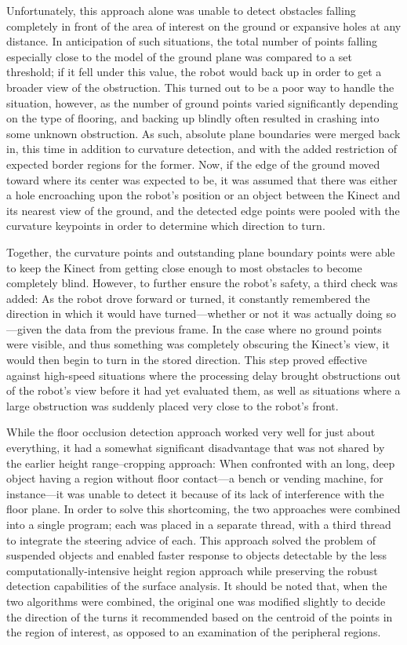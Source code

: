 \documentclass[12pt]{report}
\begin{document}
Unfortunately, this approach alone was unable to detect obstacles falling completely in front of the area of interest on the ground or expansive holes at any distance.  In anticipation of such situations, the total number of points falling especially close to the model of the ground plane was compared to a set threshold; if it fell under this value, the robot would back up in order to get a broader view of the obstruction.  This turned out to be a poor way to handle the situation, however, as the number of ground points varied significantly depending on the type of flooring, and backing up blindly often resulted in crashing into some unknown obstruction.  As such, absolute plane boundaries were merged back in, this time in addition to curvature detection, and with the added restriction of expected border regions for the former.  Now, if the edge of the ground moved toward where its center was expected to be, it was assumed that there was either a hole encroaching upon the robot's position or an object between the Kinect and its nearest view of the ground, and the detected edge points were pooled with the curvature keypoints in order to determine which direction to turn.

Together, the curvature points and outstanding plane boundary points were able to keep the Kinect from getting close enough to most obstacles to become completely blind.  However, to further ensure the robot's safety, a third check was added:  As the robot drove forward or turned, it constantly remembered the direction in which it would have turned---whether or not it was actually doing so---given the data from the previous frame.  In the case where no ground points were visible, and thus something was completely obscuring the Kinect's view, it would then begin to turn in the stored direction.  This step proved effective against high-speed situations where the processing delay brought obstructions out of the robot's view before it had yet evaluated them, as well as situations where a large obstruction was suddenly placed very close to the robot's front.

While the floor occlusion detection approach worked very well for just about everything, it had a somewhat significant disadvantage that was not shared by the earlier height range--cropping approach:  When confronted with an long, deep object having a region without floor contact---a bench or vending machine, for instance---it was unable to detect it because of its lack of interference with the floor plane.  In order to solve this shortcoming, the two approaches were combined into a single program; each was placed in a separate thread, with a third thread to integrate the steering advice of each.  This approach solved the problem of suspended objects and enabled faster response to objects detectable by the less computationally-intensive height region approach while preserving the robust detection capabilities of the surface analysis.  It should be noted that, when the two algorithms were combined, the original one was modified slightly to decide the direction of the turns it recommended based on the centroid of the points in the region of interest, as opposed to an examination of the peripheral regions.
\end{document}
